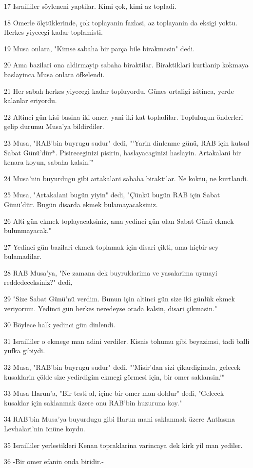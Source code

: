 \par 17 Israilliler söyleneni yaptilar. Kimi çok, kimi az topladi.
\par 18 Omerle ölçtüklerinde, çok toplayanin fazlasi, az toplayanin da eksigi yoktu. Herkes yiyecegi kadar toplamisti.
\par 19 Musa onlara, "Kimse sabaha bir parça bile birakmasin" dedi.
\par 20 Ama bazilari ona aldirmayip sabaha biraktilar. Biraktiklari kurtlanip kokmaya baslayinca Musa onlara öfkelendi.
\par 21 Her sabah herkes yiyecegi kadar topluyordu. Günes ortaligi isitinca, yerde kalanlar eriyordu.
\par 22 Altinci gün kisi basina iki omer, yani iki kat topladilar. Toplulugun önderleri gelip durumu Musa'ya bildirdiler.
\par 23 Musa, "RAB'bin buyrugu sudur" dedi, "'Yarin dinlenme günü, RAB için kutsal Sabat Günü'dür*. Pisireceginizi pisirin, haslayacaginizi haslayin. Artakalani bir kenara koyun, sabaha kalsin.'"
\par 24 Musa'nin buyurdugu gibi artakalani sabaha biraktilar. Ne koktu, ne kurtlandi.
\par 25 Musa, "Artakalani bugün yiyin" dedi, "Çünkü bugün RAB için Sabat Günü'dür. Bugün disarda ekmek bulamayacaksiniz.
\par 26 Alti gün ekmek toplayacaksiniz, ama yedinci gün olan Sabat Günü ekmek bulunmayacak."
\par 27 Yedinci gün bazilari ekmek toplamak için disari çikti, ama hiçbir sey bulamadilar.
\par 28 RAB Musa'ya, "Ne zamana dek buyruklarima ve yasalarima uymayi reddedeceksiniz?" dedi,
\par 29 "Size Sabat Günü'nü verdim. Bunun için altinci gün size iki günlük ekmek veriyorum. Yedinci gün herkes neredeyse orada kalsin, disari çikmasin."
\par 30 Böylece halk yedinci gün dinlendi.
\par 31 Israilliler o ekmege man adini verdiler. Kisnis tohumu gibi beyazimsi, tadi balli yufka gibiydi.
\par 32 Musa, "RAB'bin buyrugu sudur" dedi, "'Misir'dan sizi çikardigimda, gelecek kusaklarin çölde size yedirdigim ekmegi görmesi için, bir omer saklansin.'"
\par 33 Musa Harun'a, "Bir testi al, içine bir omer man doldur" dedi, "Gelecek kusaklar için saklanmak üzere onu RAB'bin huzuruna koy."
\par 34 RAB'bin Musa'ya buyurdugu gibi Harun mani saklanmak üzere Antlasma Levhalari'nin önüne koydu.
\par 35 Israilliler yerlestikleri Kenan topraklarina varincaya dek kirk yil man yediler.
\par 36 -Bir omer efanin onda biridir.-

